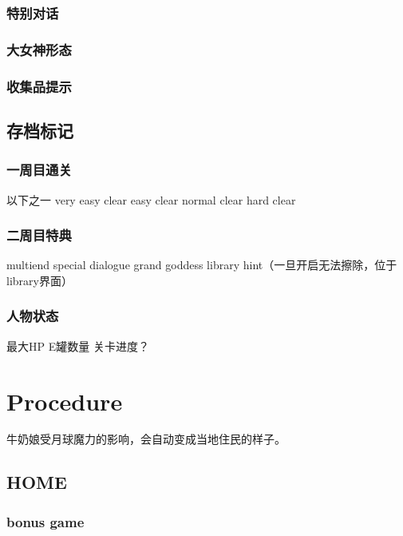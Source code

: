 \documentclass{article}
\begin{document}
\subsubsection{特别对话}

\subsubsection{大女神形态}

\subsubsection{收集品提示}

\subsection{存档标记}

\subsubsection{一周目通关}

以下之一
very easy clear
easy clear
normal clear
hard clear

\subsubsection{二周目特典}

multiend
special dialogue
grand goddess
library hint（一旦开启无法擦除，位于library界面）

\subsubsection{人物状态}

最大HP
E罐数量
关卡进度？


\section{Procedure}

牛奶娘受月球魔力的影响，会自动变成当地住民的样子。

\subsection{HOME}

\subsubsection{bonus game}
\end{document}
